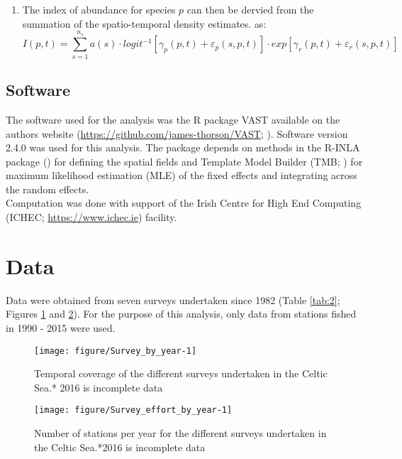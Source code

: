 \documentclass[11pt]{article}
\begin{document}
\begin{enumerate}
	\item The index of abundance for species $p$ can then be dervied from
		the summation of the spatio-temporal density estimates. 
		\cite{Thorson2017} as: 
		\begin{equation} I(p,t) =
			\sum_{s=1}^{n_{s}} a(s) \cdot
			logit^{-1}[\gamma_{p}(p,t) + \varepsilon_{p}(s,p,t)]
			\cdot exp[\gamma_{r}(p,t) + \varepsilon_{r}(s,p,t)]
		\end{equation}
\end{enumerate}

\subsection{Software}

The software used for the analysis was the R package VAST available on the
authors website (\url{https://github.com/james-thorson/VAST};
\cite{Thorson2017}).  Software version 2.4.0 was used for this analysis. The
package depends on methods in the R-INLA package (\cite{Lindgren2015}) for
defining the spatial fields and Template Model Builder (TMB;
\cite{Kristensen2015}) for maximum likelihood estimation (MLE) of the fixed
effects and integrating across the random effects. \\

Computation was done with support of the Irish Centre for High End Computing
(ICHEC; \url{https://www.ichec.ie}) facility.  \\


\section{Data}

Data were obtained from seven surveys undertaken since 1982 (Table \ref{tab:2};
Figures \ref{fig:d1} and \ref{fig:d2}). For the purpose of this analysis, only
data from stations fished in 1990 - 2015 were used. \\

\begin{figure}[!phtb]
	\centering
\texttt{[image: figure/Survey\_by\_year-1]}
\caption{Temporal coverage of the different surveys undertaken in the Celtic
	Sea.* 2016 is incomplete data}
\label{fig:d1}
\end{figure}

\begin{figure}[!phtb]
	\centering
\texttt{[image: figure/Survey\_effort\_by\_year-1]}
\caption{Number of stations per year for the different surveys undertaken in
	the Celtic Sea.*2016 is incomplete data}
\label{fig:d2}
\end{figure}
\end{document}

